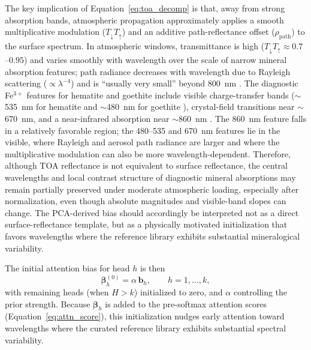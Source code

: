 \documentclass[preprint,12pt]{elsarticle}
\begin{document}
The key implication of Equation~\ref{eq:toa_decomp} is that, away from strong absorption bands, atmospheric propagation approximately applies a smooth multiplicative modulation ($T_{\downarrow} T_{\uparrow}$) and an additive path-reflectance offset ($\rho_{\text{path}}$) to the surface spectrum.
In atmospheric windows, transmittance is high ($T_{\downarrow} T_{\uparrow} \approx 0.7$--$0.95$) and varies smoothly with wavelength over the scale of narrow mineral absorption features; path radiance decreases with wavelength due to Rayleigh scattering ($\propto \lambda^{-4}$) and is ``usually very small'' beyond 800~nm \cite{richter_atcor_atbd}.
The diagnostic Fe$^{3+}$ features for hematite and goethite include visible charge-transfer bands ($\sim$535~nm for hematite and $\sim$480~nm for goethite \cite{Jiang2014AlGoethite}), crystal-field transitions near $\sim$670~nm, and a near-infrared absorption near $\sim$860~nm \cite{clark1999,sherman1985,wang2022hyspex}.
The 860~nm feature falls in a relatively favorable region; the 480--535 and 670~nm features lie in the visible, where Rayleigh and aerosol path radiance are larger and where the multiplicative modulation can also be more wavelength-dependent.
Therefore, although TOA reflectance is not equivalent to surface reflectance, the central wavelengths and local contrast structure of diagnostic mineral absorptions may remain partially preserved under moderate atmospheric loading, especially after normalization, even though absolute magnitudes and visible-band slopes can change.
The PCA-derived bias should accordingly be interpreted not as a direct surface-reflectance template, but as a physically motivated initialization that favors wavelengths where the reference library exhibits substantial mineralogical variability.

The initial attention bias for head $h$ is then
\begin{equation}
\bm{\beta}_h^{(0)} = \alpha\, \mathbf{b}_h, \qquad h = 1, \ldots, k,
\label{eq:prior_init}
\end{equation}
with remaining heads (when $H > k$) initialized to zero, and $\alpha$ controlling the prior strength. Because $\bm{\beta}_h$ is added to the pre-softmax attention scores (Equation~\ref{eq:attn_score}), this initialization nudges early attention toward wavelengths where the curated reference library exhibits substantial spectral variability.
\end{document}
